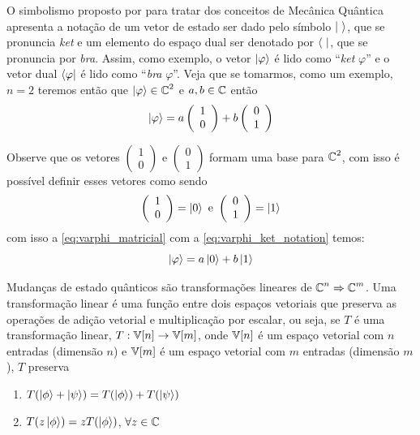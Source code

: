 O simbolismo proposto por \textcite{dirac1981principles} para tratar dos conceitos de Mecânica Quântica apresenta a notação de um vetor de estado ser dado pelo símbolo $\ket{\ }$, que se pronuncia \textit{ket} e um elemento do espaço dual ser denotado por $\bra{\ }$, que se pronuncia por \textit{bra}. Assim, como exemplo, o vetor $\ket{\varphi}$ é lido como ``\textit{ket} $\varphi$'' e o vetor dual $\bra{\varphi}$ é lido como ``\textit{bra} $\varphi$''. Veja que se tomarmos, como um exemplo, $n=2$ teremos então que $\ket{\varphi}\in\operatorname{\mathbb{C}}^2$ e $a,b\in\operatorname{\mathbb{C}}$ então
\begin{equation}\label{eq:varphi_matricial}
    \ket{\varphi}=a\left(\begin{array}{c}
         1 \\ 
         0
    \end{array}\right)+b\left(\begin{array}{c}
         0 \\
         1
    \end{array}\right)
\end{equation}

Observe que os vetores $\left(\begin{array}{c}
         1 \\ 
         0
    \end{array}\right)$ e $\left(\begin{array}{c}
         0 \\
         1
    \end{array}\right)$ formam uma base para $\operatorname{\mathbb{C}}^2$, com isso é possível definir esses vetores como sendo
\begin{equation}\label{eq:varphi_ket_notation}
\left(\begin{array}{c}
     1 \\
     0
\end{array}\right)=\ket{0}\text{ e }\left(\begin{array}{c}
     0 \\
     1
\end{array}\right)=\ket{1}
\end{equation}
com isso a \autoref{eq:varphi_matricial} com a \autoref{eq:varphi_ket_notation} temos:
$$\ket{\varphi}=a\ket{0}+b\ket{1}$$
    
Mudanças de estado quânticos são transformações lineares de $\operatorname{\mathbb{C}}^n\Rightarrow \operatorname{\mathbb{C}}^m$. Uma transformação linear é uma função entre dois espaços vetoriais que preserva as operações de adição vetorial e multiplicação por escalar, ou seja, se $T$ é uma transformação linear, $T:\operatorname{\mathbb{V}}[n]\rightarrow\operatorname{\mathbb{V}}[m]$, onde $\operatorname{\mathbb{V}}[n]
$ é um espaço vetorial com $n$ entradas (dimensão $n$) e $\operatorname{\mathbb{V}}[m]$ é um espaço vetorial com $m$ entradas (dimensão $m$), $T$ preserva
\begin{enumerate}
    \item $T(\ket{\phi}+\ket{\psi}) = T(\ket{\phi})+T(\ket{\psi})$
    \item $T(z\ket{\phi})=zT(\ket{\phi})$, $\forall z\in\operatorname{\mathbb{C}}$
\end{enumerate}

